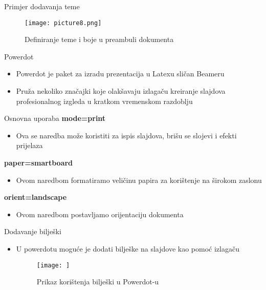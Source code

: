 \documentclass{beamer}
\begin{document}
\begin{frame}{Primjer dodavanja teme}
		 \begin{figure}
		\texttt{[image: picture8.png]} 
		\caption{Definiranje teme i boje u preambuli dokumenta}
	\end{figure}
\end{frame}
\begin{frame}{Powerdot}
 		\begin{itemize}
 			\item Powerdot je paket za izradu prezentacija u  Latexu sličan Beameru
 			\item Pruža nekoliko značajki koje olakšavaju izlagaču kreiranje slajdova profesionalnog izgleda u kratkom vremenskom razdoblju
 		\end{itemize}
\end{frame}
\begin{frame}{Osnovna uporaba}
\textbf{mode=print}
\begin{itemize}
 	\item Ova se naredba može koristiti za ispis slajdova, brišu se slojevi i efekti prijelaza
\end{itemize}
\textbf{paper=smartboard}
\begin{itemize}
    \item Ovom naredbom formatiramo veličinu papira za korištenje na širokom zaslonu 
\end{itemize}
\textbf{orient=landscape}
\begin{itemize}
    \item Ovom naredbom postavljamo orijentaciju dokumenta
\end{itemize}
\end{frame}
\begin{frame}{Dodavanje bilješki}
\begin{itemize}
    \item U powerdotu moguće je dodati bilješke na slajdove kao pomoć izlagaču
\begin{figure}
	\texttt{[image: ]}
	\caption{Prikaz korištenja bilješki u Powerdot-u}
\end{figure}
\end{itemize}
\end{frame}
\end{document}
